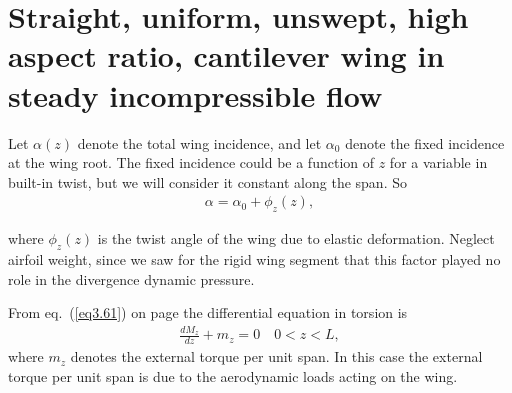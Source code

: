 \documentclass{AeroStructure-ERJohnson}
\begin{document}
\vspace*{-15pt}
\section{Straight, uniform, unswept, high aspect ratio, cantilever wing in steady incompressible flow}\label{sec12.3}

Let $\alpha(z)$ denote the total wing incidence, and let $\alpha_{0}$ denote the fixed incidence at the wing root. The fixed incidence could be a function of $z$ for a variable in built-in twist, but we will consider it constant along the span. So
\begin{align}\label{eq12.16}
\alpha=\alpha_{0}+\phi_{z}(z),
\end{align}
\vspace*{2pt}\vspace*{-8pt}
\pagebreak

{\def\thefigure{12.6}
}

\noindent where $\phi_{z}(z)$ is the twist angle of the wing due to elastic deformation. Neglect airfoil weight, since we saw for the rigid wing segment that this factor played no role in the divergence dynamic pressure.

From eq.~(\ref{eq3.61}) on page \pageref{eq3.61} the differential equation in torsion is
\begin{align}\label{eq12.17}
\frac{d M_{z}}{d z}+m_{z}=0 \quad 0<z<L,
\end{align}
where $m_{z}$ denotes the external torque per unit span. In this case the external torque per unit span is due to the aerodynamic loads acting on the wing.
\end{document}
